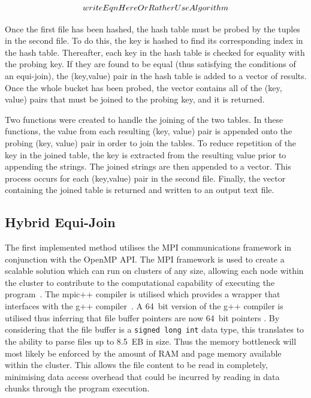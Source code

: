 \documentclass[11pt,twocolumn]{witseiepaper}
\begin{document}
\begin{equation}
 writeEqnHereOrRatherUseAlgorithm\\
\label{eqn:hash}
\end{equation}

Once the first file has been hashed, the hash table must be probed by the tuples in the second file. To do this, the key is hashed to find its corresponding index in the hash table. Thereafter, each key in the hash table is checked for equality with the probing key. If they are found to be equal (thus satisfying the conditions of an equi-join), the (key,value) pair in the hash table is added to a vector of results. Once the whole bucket has been probed, the vector contains all of the (key, value) pairs that must be joined to the probing key, and it is returned.

Two functions were created to handle the joining of the two tables. In these functions, the value from each resulting (key, value) pair is appended onto the probing (key, value) pair in order to join the tables. To reduce repetition of the key in the joined table, the key is extracted from the resulting value prior to appending the strings. The joined strings are then appended to a vector. This process occurs for each (key,value) pair in the second file. Finally, the vector containing the joined table is returned and written to an output text file.

\subsection{Hybrid Equi-Join}
The first implemented method utilises the MPI communications framework in conjunction with the OpenMP API. The MPI framework is used to create a scalable solution which can run on clusters of any size, allowing each node within the cluster to contribute to the computational capability of executing the program~\cite{mpi-scale}. The mpic++ compiler is utilised which provides a wrapper that interfaces with the g++ compiler~\cite{mpic++-wrapper}. A 64~bit version of the g++ compiler is utilised thus inferring that file buffer pointers are now 64~bit pointers \cite{pointer-size}. By considering that the file buffer is a \texttt{signed long int} data type, this translates to the ability to parse files up to 8.5~EB in size. Thus the memory bottleneck will most likely be enforced by the amount of RAM and page memory available within the cluster. This allows the file content to be read in completely, minimising data access overhead that could be incurred by reading in data chunks through the program execution.
\end{document}
